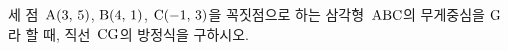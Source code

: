 세 점~$\mathrm{A}(3,\,5)$, $\mathrm{B}(4,\,1)$, $\mathrm{C}(-1,\,3)$을 꼭짓점으로 하는 삼각형~$\mathrm{ABC}$의 무게중심을 $\mathrm{G}$라 할 때, 직선~$\mathrm{CG}$의 방정식을 구하시오.
